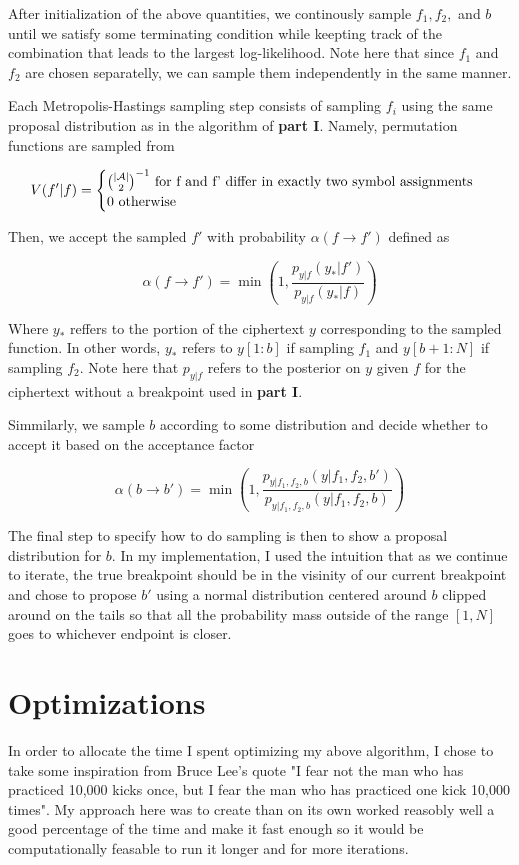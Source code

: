 \documentclass{siamart190516}
\begin{document}
After initialization of the above quantities, we continously sample $f_1, f_2,$ and $b$ until we satisfy some terminating condition while keepting track of the combination that leads to the largest log-likelihood. Note here that since $f_1$ and $f_2$ are chosen separatelly, we can sample them independently in the same manner.

Each Metropolis-Hastings sampling step consists of sampling $f_i$ using the same proposal distribution as in the algorithm of \textbf{part I}. Namely, permutation functions are sampled from

\[
  V(f' | f) = \begin{cases}
    \binom{\left| \mathcal{A} \right|}{2}^{-1} \text{  for f and f' differ in exactly two symbol assignments} \\
    0 \text{  otherwise}
  \end{cases}
\]

Then, we accept the sampled $f'$ with probability $\alpha(f \rightarrow f')$ defined as

\[
  \alpha(f \rightarrow f') = \min(1, \frac{p_{y | f}(y_* | f')}{p_{y | f}(y_* | f)})
\]

Where $y_*$ reffers to the portion of the ciphertext $y$ corresponding to the sampled function. In other words, $y_*$ refers to $y[1:b]$ if sampling $f_1$ and $y[b + 1:N]$ if sampling $f_2$. Note here that $p_{y|f}$ refers to the posterior on $y$ given $f$ for the ciphertext without a breakpoint used in \textbf{part I}.

Simmilarly, we sample $b$ according to some distribution and decide whether to accept it based on the acceptance factor

\[
  \alpha(b \rightarrow b') = \min(1, \frac{p_{y | f_1, f_2, b}(y | f_1, f_2, b')}{p_{y | f_1, f_2, b}(y | f_1, f_2, b)})
\]

The final step to specify how to do sampling is then to show a proposal distribution for $b$. In my implementation, I used the intuition that as we continue to iterate, the true breakpoint should be in the visinity of our current breakpoint and chose to propose $b'$ using a normal distribution centered around $b$ clipped around on the tails so that all the probability mass outside of the range $[1, N]$ goes to whichever endpoint is closer.


\section{Optimizations}
In order to allocate the time I spent optimizing my above algorithm, I chose to take some inspiration from Bruce Lee's quote "I fear not the man who has practiced 10,000 kicks once, but I fear the man who has practiced one kick 10,000 times". My approach here was to create than on its own worked reasobly well a good percentage of the time and make it fast enough so it would be computationally feasable to run it longer and for more iterations.
\end{document}
